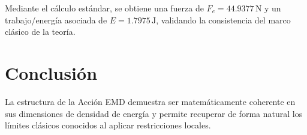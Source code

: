 \documentclass[11pt,a4paper]{article}
\begin{document}
Mediante el cálculo estándar, se obtiene una fuerza de $F_e = 44.9377 \, \text{N}$ y un trabajo/energía asociada de $E = 1.7975 \, \text{J}$, validando la consistencia del marco clásico de la teoría.

\section{Conclusión}
La estructura de la Acción EMD demuestra ser matemáticamente coherente en sus dimensiones de densidad de energía y permite recuperar de forma natural los límites clásicos conocidos al aplicar restricciones locales.
\end{document}
